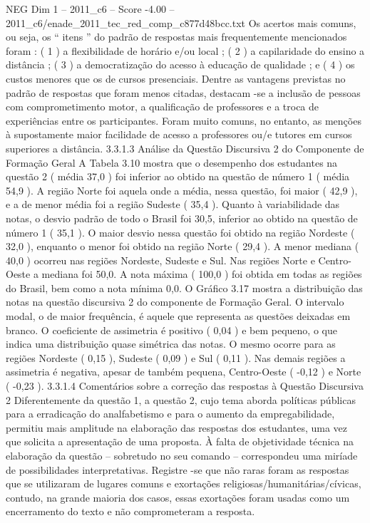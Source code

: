 \begin{textsample}{NEG Dim 1 – 2011\_c6 – Score -4.00 – 2011\_c6/enade\_2011\_tec\_red\_comp\_c877d48bcc.txt}
Os acertos mais comuns, ou seja, os “ itens ” do padrão de respostas mais frequentemente mencionados foram : ( 1 ) a flexibilidade de horário e/ou local ; ( 2 ) a capilaridade do ensino a distância ; ( 3 ) a democratização do acesso à educação de qualidade ; e ( 4 ) os custos menores que os de cursos presenciais.
Dentre as vantagens previstas no padrão de respostas que foram menos citadas, destacam -se a inclusão de pessoas com comprometimento motor, a qualificação de professores e a troca de experiências entre os participantes.
Foram muito comuns, no entanto, as menções à supostamente maior facilidade de acesso a professores ou/e tutores em cursos superiores a distância. 3.3.1.3 Análise da Questão Discursiva 2 do Componente de Formação Geral A Tabela 3.10 mostra que o desempenho dos estudantes na questão 2 ( média 37,0 ) foi inferior ao obtido na questão de número 1 ( média 54,9 ).
A região Norte foi aquela onde a média, nessa questão, foi maior ( 42,9 ), e a de menor média foi a região Sudeste ( 35,4 ).
Quanto à variabilidade das notas, o desvio padrão de todo o Brasil foi 30,5, inferior ao obtido na questão de número 1 ( 35,1 ).
O maior desvio nessa questão foi obtido na região Nordeste ( 32,0 ), enquanto o menor foi obtido na região Norte ( 29,4 ).
A menor mediana ( 40,0 ) ocorreu nas regiões Nordeste, Sudeste e Sul.
Nas regiões Norte e Centro-Oeste a mediana foi 50,0.
A nota máxima ( 100,0 ) foi obtida em todas as regiões do Brasil, bem como a nota mínima 0,0.
O Gráfico 3.17 mostra a distribuição das notas na questão discursiva 2 do componente de Formação Geral.
O intervalo modal, o de maior frequência, é aquele que representa as questões deixadas em branco.
O coeficiente de assimetria é positivo ( 0,04 ) e bem pequeno, o que indica uma distribuição quase simétrica das notas.
O mesmo ocorre para as regiões Nordeste ( 0,15 ), Sudeste ( 0,09 ) e Sul ( 0,11 ).
Nas demais regiões a assimetria é negativa, apesar de também pequena, Centro-Oeste ( -0,12 ) e Norte ( -0,23 ). 3.3.1.4 Comentários sobre a correção das respostas à Questão Discursiva 2 Diferentemente da questão 1, a questão 2, cujo tema aborda políticas públicas para a erradicação do analfabetismo e para o aumento da empregabilidade, permitiu mais amplitude na elaboração das respostas dos estudantes, uma vez que solicita a apresentação de uma proposta.
À falta de objetividade técnica na elaboração da questão – sobretudo no seu comando – correspondeu uma miríade de possibilidades interpretativas.
Registre -se que não raras foram as respostas que se utilizaram de lugares comuns e exortações religiosas/humanitárias/cívicas, contudo, na grande maioria dos casos, essas exortações foram usadas como um encerramento do texto e não comprometeram a resposta.

\end{textsample}
